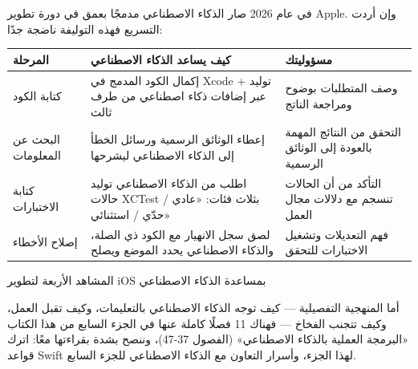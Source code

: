
في عام 2026 صار الذكاء الاصطناعي مدمجًا بعمق في دورة تطوير Apple. وإن أردت التسريع فهذه التوليفة ناضجة جدًا:

\begin{center}
\begin{tabularx}{\linewidth}{|X|X|X|}
\hline
\textbf{المرحلة} & \textbf{كيف يساعد الذكاء الاصطناعي} & \textbf{مسؤوليتك} \tabularnewline
\hline
كتابة الكود & إكمال الكود المدمج في Xcode + توليد عبر إضافات ذكاء اصطناعي من طرف ثالث & وصف المتطلبات بوضوح ومراجعة الناتج \tabularnewline
البحث عن المعلومات & إعطاء الوثائق الرسمية ورسائل الخطأ إلى الذكاء الاصطناعي ليشرحها & التحقق من النتائج المهمة بالعودة إلى الوثائق الرسمية \tabularnewline
كتابة الاختبارات & اطلب من الذكاء الاصطناعي توليد حالات XCTest بثلاث فئات: «عادي / حدّي / استثنائي» & التأكد من أن الحالات تنسجم مع دلالات مجال العمل \tabularnewline
إصلاح الأخطاء & لصق سجل الانهيار مع الكود ذي الصلة، والذكاء الاصطناعي يحدد الموضع ويصلح & فهم التعديلات وتشغيل الاختبارات للتحقق \tabularnewline
\hline
\end{tabularx}
\end{center}

\begin{center}\small\color{gray}المشاهد الأربعة لتطوير iOS بمساعدة الذكاء الاصطناعي\end{center}

أما المنهجية التفصيلية — كيف توجه الذكاء الاصطناعي بالتعليمات، وكيف تقبل العمل، وكيف تتجنب الفخاخ — فهناك 11 فصلًا كاملة عنها في الجزء السابع من هذا الكتاب «البرمجة العملية بالذكاء الاصطناعي» (الفصول 37-47)، وننصح بشدة بقراءتها معًا: اترك قواعد Swift لهذا الجزء، وأسرار التعاون مع الذكاء الاصطناعي للجزء السابع.

